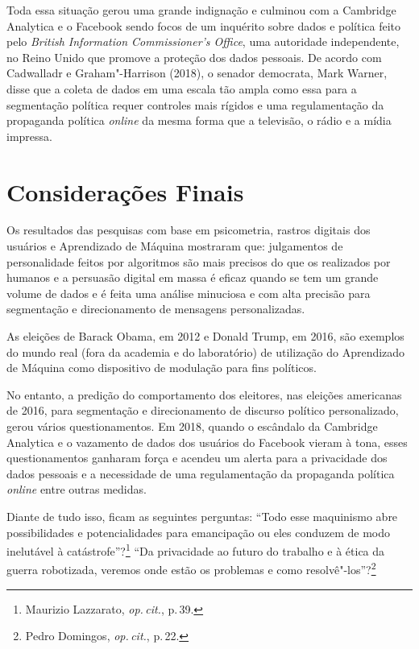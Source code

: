 Toda essa situação gerou uma grande indignação e culminou com a
Cambridge Analytica e o Facebook sendo focos de um inquérito sobre dados
e política feito pelo \textit{British Information Commissioner's Office},
uma autoridade independente, no Reino Unido que promove a proteção dos
dados pessoais. De acordo com Cadwalladr e Graham"-Harrison
(2018), o senador democrata, Mark Warner, disse que a coleta de dados em
uma escala tão ampla como essa para a segmentação política requer
controles mais rígidos e uma regulamentação da propaganda política
\textit{online} da mesma forma que a televisão, o rádio e a mídia impressa.

\section{Considerações Finais}

Os resultados das pesquisas com base em psicometria, rastros digitais
dos usuários e Aprendizado de Máquina mostraram que: julgamentos de
personalidade feitos por algoritmos são mais precisos do que os
realizados por humanos e a persuasão digital em massa é eficaz quando se
tem um grande volume de dados e é feita uma análise minuciosa e com alta
precisão para segmentação e direcionamento de mensagens personalizadas.

As eleições de Barack Obama, em 2012 e Donald Trump, em 2016, são
exemplos do mundo real (fora da academia e do laboratório) de utilização
do Aprendizado de Máquina como dispositivo de modulação para fins
políticos.

No entanto, a predição do comportamento dos eleitores, nas eleições
americanas de 2016, para segmentação e direcionamento de discurso
político personalizado, gerou vários questionamentos. Em 2018, quando o
escândalo da Cambridge Analytica e o vazamento de dados dos usuários do
Facebook vieram à tona, esses questionamentos ganharam força e acendeu
um alerta para a privacidade dos dados pessoais e a necessidade de uma
regulamentação da propaganda política \textit{online} entre outras medidas.

Diante de tudo isso, ficam as seguintes perguntas: ``Todo esse
maquinismo abre possibilidades e potencialidades para emancipação ou
eles conduzem de modo inelutável à catástrofe''?\footnote{Maurizio Lazzarato, \textit{op.\,cit.}, p.\,39.}
``Da privacidade ao futuro do trabalho e à ética da guerra robotizada,
veremos onde estão os problemas e como resolvê"-los''?\footnote{Pedro Domingos, \textit{op.\,cit.}, p.\,22.}

